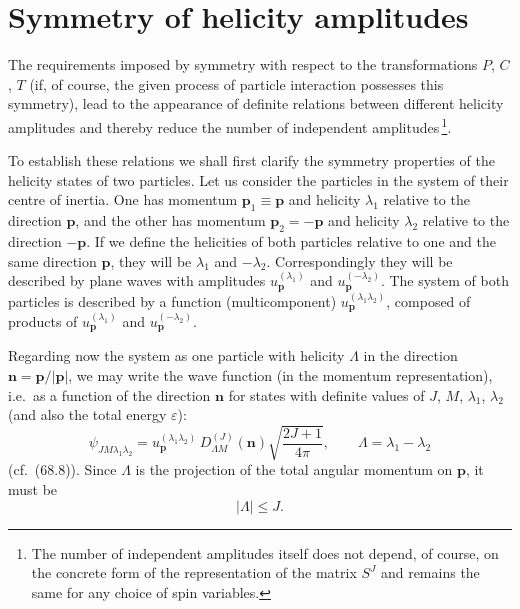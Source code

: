 \section{Symmetry of helicity amplitudes}

The requirements imposed by symmetry with respect to the transformations $P$, $C$, $T$ (if, of course, the given process of particle interaction possesses this symmetry), lead to the appearance of definite relations between different helicity amplitudes and thereby reduce the number of independent amplitudes\,\footnote{The number of independent amplitudes itself does not depend, of course, on the concrete form of the representation of the matrix $S^J$ and remains the same for any choice of spin variables.}.

To establish these relations we shall first clarify the symmetry properties of the helicity states of two particles. Let us consider the particles in the system of their centre of inertia. One has momentum $\mathbf{p}_1 \equiv \mathbf{p}$ and helicity $\lambda_1$ relative to the direction $\mathbf{p}$, and the other has momentum $\mathbf{p}_2 = -\mathbf{p}$ and helicity $\lambda_2$ relative to the direction $-\mathbf{p}$. If we define the helicities of both particles relative to one and the same direction $\mathbf{p}$, they will be $\lambda_1$ and $-\lambda_2$. Correspondingly they will be described by plane waves with amplitudes $u^{(\lambda_1)}_\mathbf{p}$ and $u^{(-\lambda_2)}_\mathbf{p}$. The system of both particles is described by a function (multicomponent) $u^{(\lambda_1\lambda_2)}_\mathbf{p}$, composed of products of $u^{(\lambda_1)}_\mathbf{p}$ and $u^{(-\lambda_2)}_\mathbf{p}$.

Regarding now the system as one particle with helicity $\Lambda$ in the direction $\mathbf{n} = \mathbf{p}/|\mathbf{p}|$, we may write the wave function (in the momentum representation), i.e.\ as a function of the direction $\mathbf{n}$ for states with definite values of $J$, $M$, $\lambda_1$, $\lambda_2$ (and also the total energy $\varepsilon$):
\begin{equation}
\psi_{JM\lambda_1\lambda_2} = u^{(\lambda_1\lambda_2)}_\mathbf{p}\,D^{(J)}_{\Lambda M}(\mathbf{n})\sqrt{\frac{2J+1}{4\pi}},\qquad \Lambda = \lambda_1 - \lambda_2
\tag{69.1}
\end{equation}
(cf.~(68.8)). Since $\Lambda$ is the projection of the total angular momentum on $\mathbf{p}$, it must be
\begin{equation}
|\Lambda| \leqslant J.
\tag{69.2}
\end{equation}

